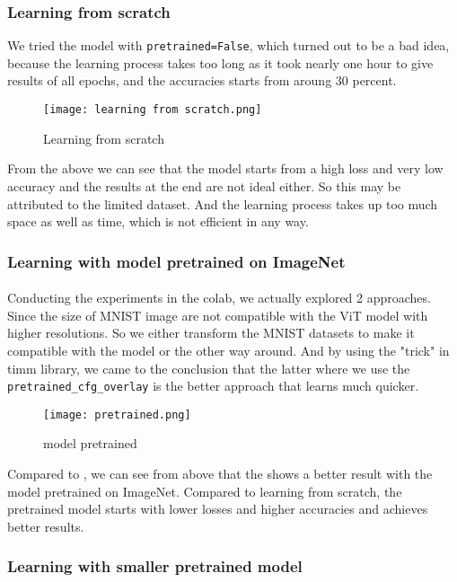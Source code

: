 \documentclass{article}
\begin{document}
\subsubsection{Learning from scratch}
We tried the model with  \texttt{pretrained=False}, which turned out to be a bad idea, because the learning process takes too long as it took nearly one hour to give results of all epochs, and the accuracies starts from aroung 30 percent.
\begin{figure}[H]
    \centering
    \texttt{[image: learning from scratch.png]}
    \caption{Learning from scratch}
    \label{fig:scratch}
\end{figure}
From the  above we can see that the model starts from a high loss and very low accuracy and the results at the end are not ideal either. So this may be attributed to the limited dataset. And the learning process takes up too much space as well as time, which is not efficient in any way.

\subsubsection{Learning with model pretrained on ImageNet}
\paragraph{}
Conducting the experiments in the colab, we actually explored 2 approaches. Since the size of MNIST image are not compatible with the ViT model with higher resolutions. So we either transform the MNIST datasets to make it compatible with the model or the other way around. And by using the "trick" in timm library, we came to the conclusion that the latter where we use the   \texttt{pretrained\_cfg\_overlay} is the better approach that learns much quicker.
\begin{figure}[H]
    \centering
    \texttt{[image: pretrained.png]}
    \caption{model pretrained}
    \label{fig:pretrained}
\end{figure}
Compared to , we can see from above that the  shows a better result with the model pretrained on ImageNet. Compared to learning from scratch, the pretrained model starts with lower losses and higher accuracies and achieves better results.

\subsubsection{Learning with smaller pretrained model }
\end{document}
